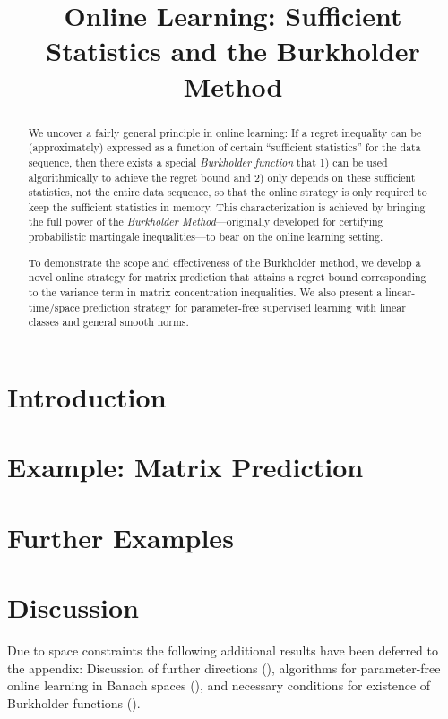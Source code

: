 \documentclass[final,12pt]{colt2018}
\title[Online Learning: Sufficient Statistics and the Burkholder Method]{Online Learning: Sufficient Statistics and the Burkholder Method}
\date{}
\begin{document}
\maketitle

\begin{abstract}
We uncover a fairly general principle in online learning: If a regret inequality can be (approximately) expressed as a function of certain ``sufficient statistics'' for the data sequence, then there exists a special \emph{Burkholder function} that 1) can be used algorithmically to achieve the regret bound and 2) only depends on these sufficient statistics, not the entire data sequence,  so that the online strategy is only required to keep the sufficient statistics in memory. This characterization is achieved by bringing the full power of the \emph{Burkholder Method}---originally developed for certifying probabilistic martingale inequalities---to bear on the online learning setting.

To demonstrate the scope and effectiveness of the Burkholder method, we develop a novel online strategy for matrix prediction that attains a regret bound corresponding to the variance term in matrix concentration inequalities. We also present a linear-time/space prediction strategy for parameter-free supervised learning with linear classes and general smooth norms. 

\end{abstract}

\section{Introduction}




\section{Example: Matrix Prediction}
\label{sec:matrix}


\section{Further Examples}
\label{sec:further}



\section*{Discussion}
Due to space constraints the following additional results have been deferred to the appendix: Discussion of further directions (), algorithms for parameter-free online learning in Banach spaces (), and necessary conditions for existence of Burkholder functions ().
\end{document}
